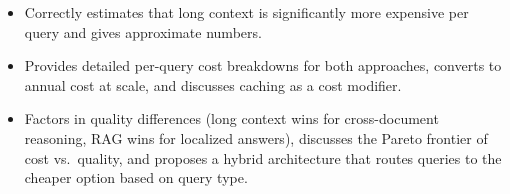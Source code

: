 \begin{interviewq}
\goodgreat
\begin{itemize}
    \item {} Correctly estimates that long context is significantly more expensive per query and gives approximate numbers.
    \item {} Provides detailed per-query cost breakdowns for both approaches, converts to annual cost at scale, and discusses caching as a cost modifier.
    \item {} Factors in quality differences (long context wins for cross-document reasoning, RAG wins for localized answers), discusses the Pareto frontier of cost vs.\ quality, and proposes a hybrid architecture that routes queries to the cheaper option based on query type.
\end{itemize}

\end{interviewq}


